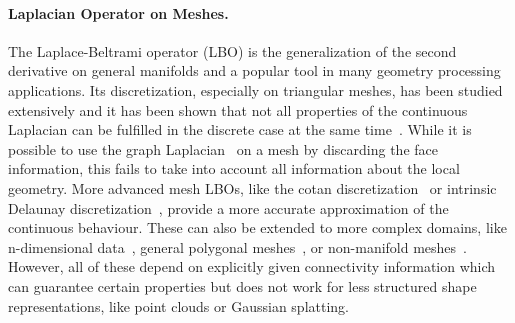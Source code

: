 \paragraph{Laplacian Operator on Meshes.} 
The Laplace-Beltrami operator (LBO) is the generalization of the second derivative on general manifolds and a popular tool in many geometry processing applications. 
Its discretization, especially on triangular meshes, has been studied extensively and it has been shown that not all properties of the continuous Laplacian can be fulfilled in the discrete case at the same time~\cite{wardetzky2007nofreelunch}. 
While it is possible to use the graph Laplacian~\cite{taubin1995fairsurface} on a mesh by discarding the face information, this fails to take into account all information about the local geometry. 
More advanced mesh LBOs, like the cotan discretization~\cite{pinkallporthier,meyer2003discrete} or intrinsic Delaunay discretization~\cite{bobenko2007simplicial}, provide a more accurate approximation of the continuous behaviour. 
These can also be extended to more complex domains, like n-dimensional data~\cite{crane2019ndim}, general polygonal meshes~\cite{alexa2011polygonal,bunge2020polygon}, or non-manifold meshes~\cite{sharp2020nonmanifold}.
However, all of these depend on explicitly given connectivity information which can guarantee certain properties but does not work for less structured shape representations, like point clouds or Gaussian splatting.

